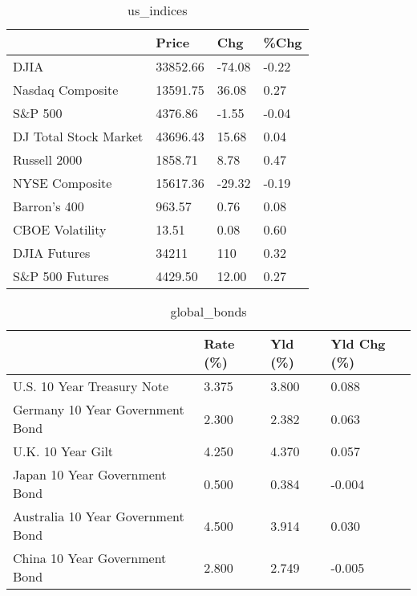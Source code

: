 \documentclass{article}%
\begin{document}
%


\begin{table}[htbp]%
\caption{us\_indices}%
\centering%
\begin{adjustbox}{width=1\textwidth}%
\begin{tabular}{llll}
\toprule
                      &    Price &    Chg &  \%Chg \\
\midrule
                 DJIA & 33852.66 & -74.08 & -0.22 \\
     Nasdaq Composite & 13591.75 &  36.08 &  0.27 \\
              S\&P 500 &  4376.86 &  -1.55 & -0.04 \\
DJ Total Stock Market & 43696.43 &  15.68 &  0.04 \\
         Russell 2000 &  1858.71 &   8.78 &  0.47 \\
       NYSE Composite & 15617.36 & -29.32 & -0.19 \\
         Barron's 400 &   963.57 &   0.76 &  0.08 \\
      CBOE Volatility &    13.51 &   0.08 &  0.60 \\
         DJIA Futures &    34211 &    110 &  0.32 \\
      S\&P 500 Futures &  4429.50 &  12.00 &  0.27 \\
\bottomrule
\end{tabular}
%
\end{adjustbox}%
\end{table}

%


\begin{table}[htbp]%
\caption{global\_bonds}%
\centering%
\begin{adjustbox}{width=1\textwidth}%
\begin{tabular}{llll}
\toprule
                                  & Rate (\%) & Yld (\%) & Yld Chg (\%) \\
\midrule
       U.S. 10 Year Treasury Note &    3.375 &   3.800 &       0.088 \\
  Germany 10 Year Government Bond &    2.300 &   2.382 &       0.063 \\
                U.K. 10 Year Gilt &    4.250 &   4.370 &       0.057 \\
    Japan 10 Year Government Bond &    0.500 &   0.384 &      -0.004 \\
Australia 10 Year Government Bond &    4.500 &   3.914 &       0.030 \\
    China 10 Year Government Bond &    2.800 &   2.749 &      -0.005 \\
\bottomrule
\end{tabular}
%
\end{adjustbox}%
\end{table}
\end{document}
